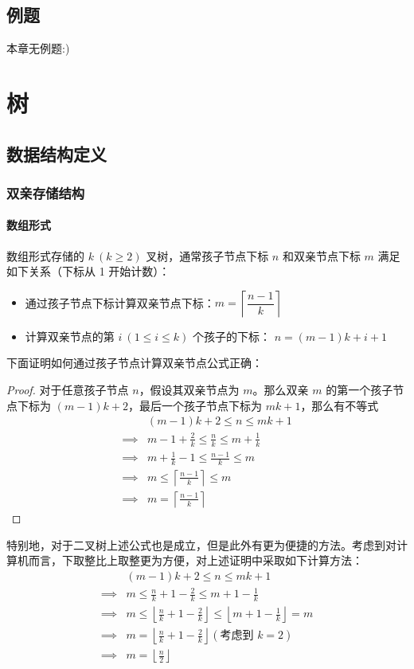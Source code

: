 \documentclass{ctexart}
\begin{document}
\subsection{例题}
本章无例题:)


\section{树}
\subsection{数据结构定义}
\subsubsection{双亲存储结构}
\paragraph{数组形式}
数组形式存储的 $k\ (k \ge 2)$ 叉树，通常孩子节点下标 $n$ 和双亲节点下标 $m$ 满足如下关系（下标从 1 开始计数）：
\begin{itemize}
    \item 通过孩子节点下标计算双亲节点下标：$m = \left\lceil \dfrac{n-1}{k} \right\rceil$
    \item 计算双亲节点的第 $i\ (1 \le i \le k)$ 个孩子的下标： $n = (m - 1)k+i+1$
\end{itemize}
下面证明如何通过孩子节点计算双亲节点公式正确：
\begin{proof}
    对于任意孩子节点 $n$，假设其双亲节点为 $m$。那么双亲 $m$ 的第一个孩子节点下标为 $(m-1) k+2$，最后一个孩子节点下标为 $mk+1$，那么有不等式
    $$
    \begin{aligned}
    & (m-1)k + 2 \le n \le mk+1 \\
        \implies & m -1 + \frac{2}{k} \le \frac{n}{k} \le m+\frac{1}{k} \\
        \implies & m+ \frac{1}{k} - 1 \le \frac{n-1}{k} \le m \\
        \implies & m \le \left\lceil \frac{n-1}{k} \right\rceil \le m \\
        \implies & m = \left\lceil \frac{n-1}{k} \right\rceil
    \end{aligned}
    $$
\end{proof}
特别地，对于二叉树上述公式也是成立，但是此外有更为便捷的方法。考虑到对计算机而言，下取整比上取整更为方便，对上述证明中采取如下计算方法：
$$
\begin{aligned}
& (m-1)k + 2 \le n \le mk+1 \\
    \implies & m \le \frac{n}{k} + 1 - \frac{2}{k} \le m + 1 - \frac{1}{k} \\
    \implies & m \le \left\lfloor \frac{n}{k} + 1 - \frac{2}{k} \right\rfloor \le \left\lfloor m + 1-\frac{1}{k} \right\rfloor = m \\
    \implies & m = \left\lfloor \frac{n}{k} + 1 - \frac{2}{k} \right\rfloor (\text{考虑到 } k = 2) \\
    \implies & m = \left\lfloor \frac{n}{2} \right\rfloor \\
\end{aligned}
$$
\end{document}
